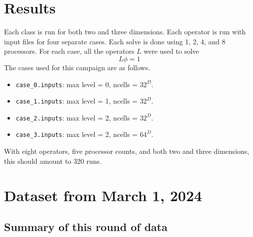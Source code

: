 \documentclass{article}
\begin{document}
 \section{Results}
 
 Each class is run for both two and three dimensions.   Each operator
 is run with input files for  four separate cases.    Each solve is
 done using 1, 2, 4, and 8 processors.
 For each case, all the operators $L$ were used to solve
$$
L\phi = 1
$$
The cases used for this campaign are as follows.
 \begin{itemize}
   \item {\tt case\_0.inputs}: max level = 0, ncells = $32^D$.
   \item {\tt case\_1.inputs}: max level = 1, ncells = $32^D$.
   \item {\tt case\_2.inputs}: max level = 2, ncells = $32^D$.
   \item {\tt case\_3.inputs}: max level = 2, ncells = $64^D$.
 \end{itemize}
 With eight operators, five processor counts,
 and both two and three dimensions,
 this should amount to 320 runs.    
\section{Dataset from March 1, 2024}
 
\subsection{Summary of this round of data}
\end{document}
